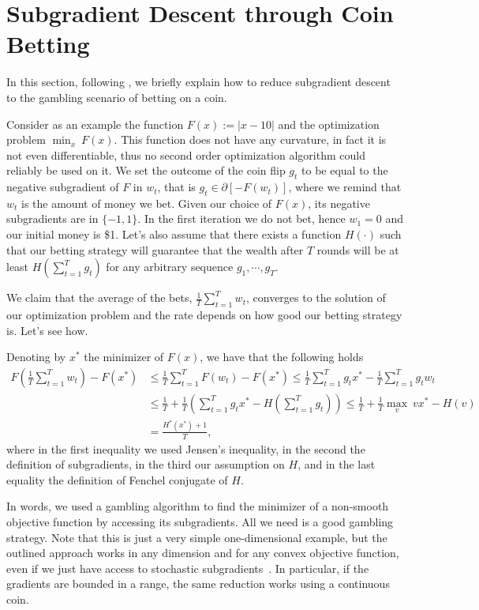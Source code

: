 \documentclass{article}
\begin{document}
 \section{Subgradient Descent through Coin Betting}
\label{sec:coin}

In this section, following \citet{OrabonaP16b}, we briefly explain how to reduce subgradient 
descent to the gambling scenario of betting on a coin.


Consider as an example the function $F(x):=|x-10|$ and the optimization problem  $\min_{x} \ F(x)$.
This function does not have any curvature, in fact it is not even differentiable, thus
no second order optimization algorithm could reliably be used on it.
We set the outcome of the coin flip $g_t$
to be equal to the negative subgradient of $F$ in $w_t$, that is $g_t \in \partial [-F(w_t)]$, where we remind that $w_t$ is the amount of money we bet. 
Given our choice of $F(x)$, its negative subgradients are in $\{-1,1\}$.
In the first iteration we do not bet, hence $w_1=0$ and our initial money is \$1. 
Let's also assume that there exists a function $H(\cdot)$ such that our betting strategy will 
guarantee that the wealth after $T$ rounds will be at least $H(\sum_{t=1}^T g_t)$ for any arbitrary sequence $g_1, \cdots, g_T$.

We claim that the average of the bets, $\tfrac{1}{T}\sum_{t=1}^T w_t$, converges to the solution of our 
optimization problem and the rate depends on how good our betting strategy is. Let's see how.

Denoting by $x^*$ the minimizer of $F(x)$, we have that the following holds 
\begin{align*}
F\left(\frac{1}{T} \sum_{t=1}^T w_t\right) - F(x^*) 
&\leq \frac{1}{T} \sum_{t=1}^T F(w_t) - F(x^*)
\leq \frac{1}{T}\sum_{t=1}^T g_t x^* -\frac{1}{T}\sum_{t=1}^T g_t w_t \\
&\leq \tfrac{1}{T}+\tfrac{1}{T}\left(\sum_{t=1}^T g_t x^*  - H\left(\sum_{t=1}^T g_t\right)\right)
\leq \tfrac{1}{T}+\tfrac{1}{T}\max_v \ v x^*  - H(v) \\
&= \tfrac{H^*(x^*)+1}{T},
\end{align*}
where in the first inequality we used Jensen's inequality, in the second the definition of subgradients, 
in the third our assumption on $H$, and in the last equality the definition of Fenchel conjugate of $H$.

In words, we used a gambling algorithm to find the minimizer of a non-smooth objective function by 
accessing its subgradients. All we need is a good gambling strategy. Note that this is just a very 
simple one-dimensional example, but the outlined approach works in any dimension and for any convex 
objective function, even if we just have access to stochastic subgradients~\citep{OrabonaP16b}. 
In particular, if the gradients are bounded in a range, the same reduction works using a continuous coin.
\end{document}
